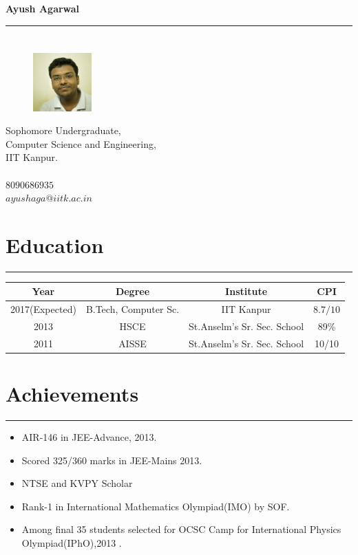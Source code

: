 \documentclass[a4paper]{article}
\author{Ayush Agarwal}
\begin{document}
\begin{center}
 \huge\textbf{Ayush Agarwal}\\
\end{center}
\hrule
\section*{}
\begin{figure} 
    \includegraphics[width=0.20\textwidth]{photo}
\end{figure}
 Sophomore Undergraduate,\\
 Computer Science and Engineering,\\
 IIT Kanpur.\\
 \\
 $8090686935$\\
 $ayushaga@iitk.ac.in$\\
 \vspace{10mm}
 \section*{Education}
 \hrule
 \begin{center}
 \vspace{3mm}
  \begin{tabular}{|c|c|c|c|}
  \hline
  Year & Degree & Institute & CPI\\
  \hline
  2017(Expected)& B.Tech, Computer Sc.&IIT Kanpur&$8.7/10$\\
  \hline
  2013& HSCE&St.Anselm's Sr. Sec. School&89\% \\
  \hline
  2011& AISSE&St.Anselm's Sr. Sec. School&10/10 \\
  \hline
  \end{tabular}

 \end{center}
 \section*{Achievements}
 \hrule
 \vspace{3mm}
  \begin{itemize}
   \item AIR-146 in JEE-Advance, 2013.	
   \item Scored 325/360 marks in JEE-Mains 2013.
   \item NTSE and KVPY Scholar 
   \item Rank-1 in International Mathematics Olympiad(IMO) by SOF.
   \item Among final 35 students selected for OCSC Camp for International Physics Olympiad(IPhO),2013 .
  \end{itemize}
\end{document}
